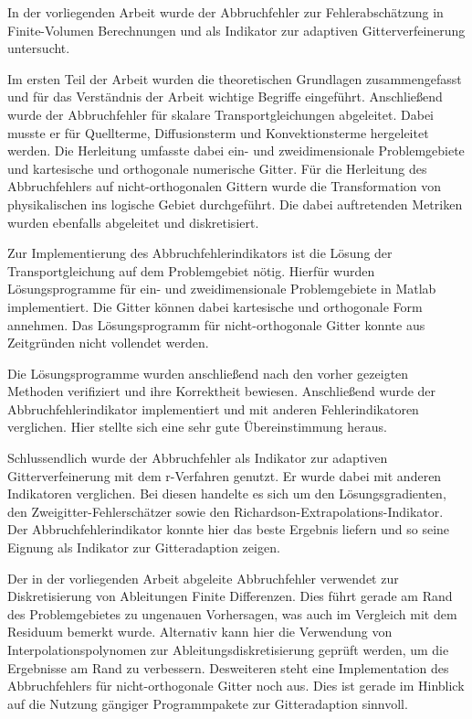 In der vorliegenden Arbeit wurde der Abbruchfehler zur Fehlerabschätzung
in Finite-Volumen Berechnungen und als Indikator zur
adaptiven Gitterverfeinerung untersucht.

Im ersten Teil der Arbeit wurden die theoretischen Grundlagen zusammengefasst
und für das Verständnis der Arbeit wichtige Begriffe eingeführt.
Anschließend wurde der Abbruchfehler für skalare Transportgleichungen abgeleitet.
Dabei musste er für Quellterme, Diffusionsterm und Konvektionsterme hergeleitet werden.
Die Herleitung umfasste dabei ein- und zweidimensionale Problemgebiete und kartesische und orthogonale
numerische Gitter. Für die Herleitung des Abbruchfehlers auf nicht-orthogonalen Gittern
wurde die Transformation von physikalischen ins logische Gebiet durchgeführt. Die
dabei auftretenden Metriken wurden ebenfalls abgeleitet und
diskretisiert.

Zur Implementierung des Abbruchfehlerindikators ist die Lösung der Transportgleichung
auf dem Problemgebiet nötig. Hierfür wurden Lösungsprogramme für ein- und zweidimensionale
Problemgebiete in Matlab implementiert. Die Gitter können dabei kartesische und orthogonale
Form annehmen. Das Lösungsprogramm für nicht-orthogonale Gitter konnte aus Zeitgründen nicht vollendet werden.

Die Lösungsprogramme wurden anschließend nach den vorher gezeigten Methoden
verifiziert und ihre Korrektheit bewiesen.
Anschließend wurde der Abbruchfehlerindikator implementiert und mit anderen Fehlerindikatoren verglichen.
Hier stellte sich eine sehr gute Übereinstimmung heraus.

Schlussendlich
wurde der Abbruchfehler als Indikator zur adaptiven Gitterverfeinerung mit dem r-Verfahren genutzt.
Er wurde dabei mit anderen Indikatoren verglichen. Bei diesen handelte es sich um den
Lösungsgradienten, den Zweigitter-Fehlerschätzer sowie den Richardson-Extrapolations-Indikator.
Der Abbruchfehlerindikator konnte hier das beste Ergebnis liefern und so seine Eignung
als Indikator zur Gitteradaption zeigen.

Der in der vorliegenden Arbeit abgeleite Abbruchfehler verwendet zur Diskretisierung von Ableitungen
Finite Differenzen. Dies führt gerade am Rand des Problemgebietes zu ungenauen Vorhersagen, was
auch im Vergleich mit dem Residuum bemerkt wurde.
Alternativ kann hier die Verwendung von Interpolationspolynomen 
zur Ableitungsdiskretisierung geprüft werden, um die Ergebnisse am Rand zu verbessern.
Desweiteren steht eine Implementation des Abbruchfehlers für nicht-orthogonale Gitter
noch aus. Dies ist gerade im Hinblick auf die Nutzung gängiger Programmpakete zur Gitteradaption
sinnvoll.
